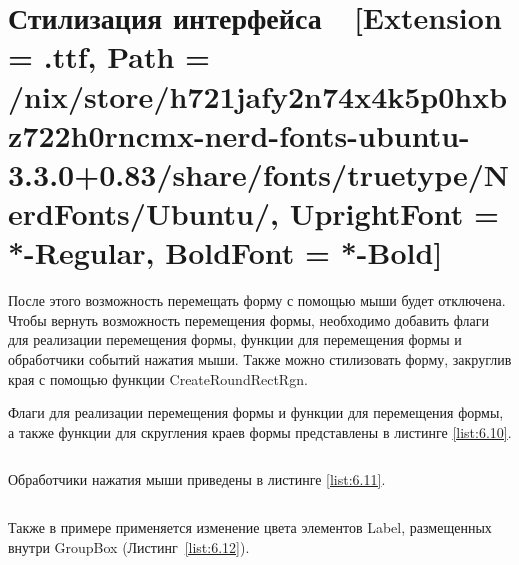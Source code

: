 \documentclass[12pt]{article}
\newcommand{\icon}[1]{\fontspec{UbuntuNerdFont}[Extension = .ttf,
  Path = /nix/store/h721jafy2n74x4k5p0hxbz722h0rncmx-nerd-fonts-ubuntu-3.3.0+0.83/share/fonts/truetype/NerdFonts/Ubuntu/,
  UprightFont = *-Regular,
BoldFont = *-Bold] #1}
\newcommand{\iicon}[1]{{\icon{#1}}}
\newcommand{\colorGIT}[1]{\textcolor{CtpLavender}{#1}}
\renewcommand{\texttt}[1]{{\small\ttfamily #1}}
\newenvironment{code}
  {\par\captionsetup{type=listing}\noindent}
  {\par\vspace{\baselineskip}}
\numberwithin{listing}{section}
\numberwithin{figure}{section}
\begin{document}
\newpage

\section{Стилизация интерфейса~~\texorpdfstring{\iicon{}}{}}


После этого возможность перемещать форму с помощью мыши будет отключена. Чтобы вернуть возможность перемещения формы, необходимо добавить флаги для реализации перемещения формы, функции для перемещения формы и обработчики событий нажатия мыши. Также можно стилизовать форму, закруглив края с помощью функции \texttt{CreateRoundRectRgn}.

Флаги для реализации перемещения формы и функции для перемещения формы, а также функции для скругления краев формы представлены в листинге \ref{list:6.10}.

\begin{code}
	\inputminted[firstline = 22, lastline=45]{csharp}{../2lab/WinFormsApp1example_/Form1.cs}
	\caption{\colorGIT{\href{https://github.com/WebMasterIT/Csharp_Labs/blob/c79e983c4cab3c416e44b6d5f9854b292fdeae26/2lab/WinFormsApp1example_/Form1.cs\#L22-L45}{Функции}} реализации перемещения формы}
	\label{list:6.10}
\end{code}

Обработчики нажатия мыши приведены в листинге \ref{list:6.11}.

\begin{code}
	\inputminted[firstline = 47, lastline=78]{csharp}{../2lab/WinFormsApp1example_/Form1.cs}
	\caption{\colorGIT{\href{https://github.com/WebMasterIT/Csharp_Labs/blob/c79e983c4cab3c416e44b6d5f9854b292fdeae26/2lab/WinFormsApp1example_/Form1.cs\#L47-L78}{Обработчики}} движения мыши}
	\label{list:6.11}
\end{code}

Также в примере применяется изменение цвета элементов \texttt{Label}, размещенных внутри \texttt{GroupBox} (Листинг~\ref{list:6.12}).

\begin{code}
	\inputminted[firstline = 134, lastline=163]{csharp}{../2lab/WinFormsApp1example_/Form1.cs}
	\caption{\colorGIT{\href{https://github.com/WebMasterIT/Csharp_Labs/blob/c79e983c4cab3c416e44b6d5f9854b292fdeae26/2lab/WinFormsApp1example_/Form1.cs\#L134-L163}{Изменение}} цвета \texttt{Label} внутри \texttt{GroupBox}}
	\label{list:6.12}
\end{code}
\end{document}
